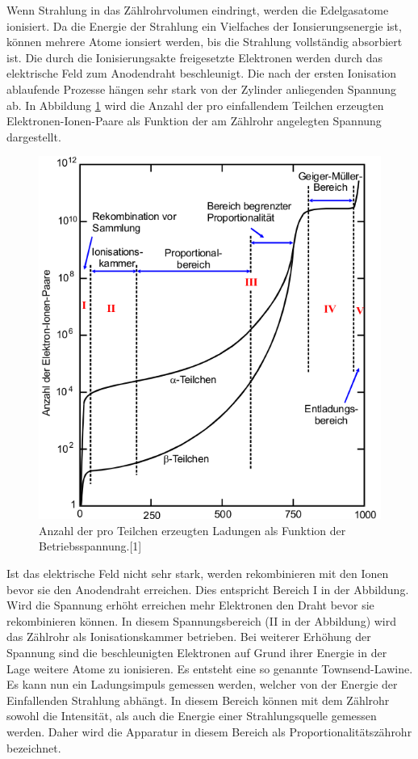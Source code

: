 \documentclass[11pt,ngerman,a4paper]{article}
\begin{document}
 \noindent
 Wenn Strahlung in das Zählrohrvolumen eindringt, werden die Edelgasatome ionisiert. Da die Energie der Strahlung ein Vielfaches der Ionsierungsenergie ist, können mehrere Atome ionsiert werden, bis die Strahlung vollständig absorbiert ist. Die durch die Ionisierungsakte freigesetzte Elektronen werden durch das elektrische Feld  zum Anodendraht beschleunigt.
Die nach der ersten Ionisation ablaufende Prozesse hängen sehr stark von der Zylinder anliegenden Spannung ab. In Abbildung \ref{abb2} wird die Anzahl der pro einfallendem Teilchen erzeugten Elektronen-Ionen-Paare als Funktion der am Zählrohr angelegten Spannung dargestellt.
\begin{figure}[htp]
\centering
\includegraphics[scale=0.5]{abb2.png}
\caption{Anzahl der pro Teilchen erzeugten Ladungen als Funktion der Betriebsspannung.[1]}
\label{abb2}
\end{figure}
Ist das elektrische Feld nicht sehr stark, werden rekombinieren mit den Ionen bevor sie den Anodendraht erreichen. Dies entspricht Bereich I in der Abbildung. Wird die Spannung erhöht erreichen mehr Elektronen den Draht bevor sie rekombinieren können. In diesem Spannungsbereich (II in der Abbildung) wird das Zählrohr als Ionisationskammer betrieben. Bei weiterer Erhöhung der Spannung sind  die beschleunigten Elektronen auf Grund ihrer Energie in der Lage weitere Atome zu ionisieren. Es entsteht eine so genannte Townsend-Lawine. Es kann nun ein Ladungsimpuls gemessen werden, welcher von der Energie der Einfallenden Strahlung abhängt. In diesem Bereich können mit dem Zählrohr sowohl die Intensität, als auch die Energie einer Strahlungsquelle gemessen werden. Daher wird die Apparatur in diesem Bereich als Proportionalitätszährohr bezeichnet. 
\end{document}
